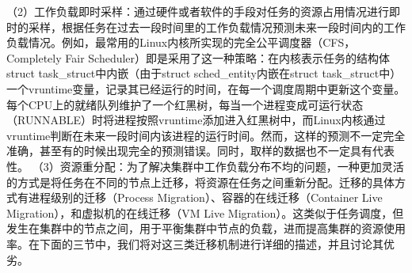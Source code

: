 （2）工作负载即时采样：通过硬件或者软件的手段对任务的资源占用情况进行即时的采样，根据任务在过去一段时间里的工作负载情况预测未来一段时间内的工作负载情况。例如，最常用的Linux内核所实现的完全公平调度器（CFS，Completely Fair Scheduler）即是采用了这一种策略：在内核表示任务的结构体struct task\_struct中内嵌（由于struct sched\_entity内嵌在struct task\_struct中）一个vruntime变量，记录其已经运行的时间，在每一个调度周期中更新这个变量。每个CPU上的就绪队列维护了一个红黑树，每当一个进程变成可运行状态（RUNNABLE）时将进程按照vruntime添加进入红黑树中，而Linux内核通过vruntime判断在未来一段时间内该进程的运行时间。然而，这样的预测不一定完全准确，甚至有的时候出现完全的预测错误。同时，取样的数据也不一定具有代表性。
\label{chap:reallocation}
（3）资源重分配：为了解决集群中工作负载分布不均的问题，一种更加灵活的方式是将任务在不同的节点上迁移，将资源在任务之间重新分配。迁移的具体方式有进程级别的迁移（Process Migration）、容器的在线迁移（Container Live Migration），和虚拟机的在线迁移（VM Live Migration）。这类似于任务调度，但发生在集群中的节点之间，用于平衡集群中节点的负载，进而提高集群的资源使用率。在下面的三节中，我们将对这三类迁移机制进行详细的描述，并且讨论其优劣。
